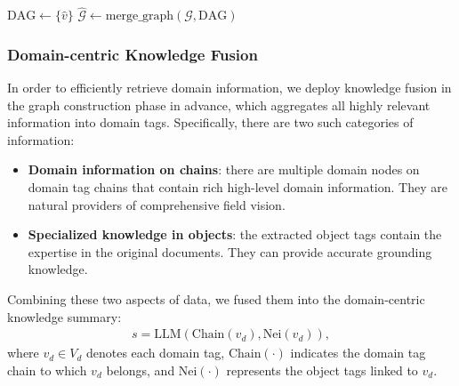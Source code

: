 \documentclass[11pt]{article}
\begin{document}
\begin{algorithm}[h!]
    
    $\text{DAG} \leftarrow \{\hat{v}\}$\;
    $\mathcal{\hat{G}} \leftarrow \text{merge\_graph}(\mathcal{G}, \text{DAG})$\;
    \caption{Domain Tag Chain Organization}
    \label{algo:chain_organization}
\end{algorithm}


\subsubsection{Domain-centric Knowledge Fusion}
In order to efficiently retrieve domain information, we deploy knowledge fusion in the graph construction phase in advance, which aggregates all highly relevant information into domain tags.
Specifically, there are two such categories of information:

\begin{itemize}
    \item \textbf{Domain information on chains}: there are multiple domain nodes on domain tag chains that contain rich high-level domain information. They are natural providers of comprehensive field vision.
    \item \textbf{Specialized knowledge in objects}: the extracted object tags contain the expertise in the original documents. They can provide accurate grounding knowledge.
\end{itemize}

Combining these two aspects of data, we fused them into the domain-centric knowledge summary:
\begin{align*}
    s = \text{LLM}(\text{Chain}(v_d), \text{Nei}(v_d)),
\end{align*}
where $v_d \in V_d$ denotes each domain tag, $\text{Chain}(\cdot)$ indicates the domain tag chain to which $v_d$ belongs, and $\text{Nei}(\cdot)$ represents the object tags linked to $v_d$. 
\end{document}
